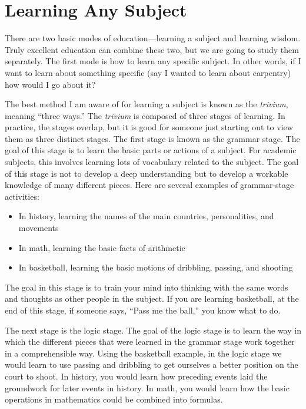 \documentclass[letterpaper]{article}
\begin{document}
\section{Learning Any Subject}
{\color{black}
There are two basic modes of education—learning a subject and learning
wisdom. Truly excellent education can combine these two, but we are
going to study them separately. The first mode is how to learn any
specific subject. In other words, if I want to learn about something
specific \textcolor[rgb]{0.32941177,0.5529412,0.83137256}{(}say I
wanted to learn about
carpentry\textcolor[rgb]{0.32941177,0.5529412,0.83137256}{)} how would
I go about it?  }

{\color{black}
The best method I am aware of for learning a subject is known as the
\textit{trivium}, meaning “three ways.”  The \textit{trivium} is
composed of three stages of learning. In practice, the stages overlap,
but it is good for someone just starting out to view them as three
distinct stages. The first stage is known as the grammar stage. The
goal of this stage is to learn the basic parts or actions of a subject.
For academic subjects, this involves learning lots of vocabulary
related to the subject. The goal of this stage is not to develop a deep
understanding but to develop a workable knowledge of many different
pieces. Here are several examples of grammar-stage activities:}

\begin{itemize}
\item {\color{black}
In history, learning the names of the main countries, personalities, and
movements}
\item {\color{black}
In math, learning the basic facts of arithmetic}
\item {\color{black}
In basketball, learning the basic motions of dribbling, passing, and
shooting}
\end{itemize}
{\color{black}
The goal in this stage is to train your mind into thinking with the same
words and thoughts as other people in the subject. If you are learning
basketball, at the end of this stage, if someone says, “Pass me the
ball,” you know what to do.}

{\color{black}
The next stage is the logic stage. The goal of the logic stage is to
learn the way in which the different pieces that were learned in the
grammar stage work together in a comprehensible way. Using the
basketball example, in the logic stage we would learn to use passing
and dribbling to get ourselves a better position on the court to shoot.
In history, you would learn how preceding events laid the groundwork
for later events in history. In math, you would learn how the basic
operations in mathematics could be combined into formulas.}
\end{document}
